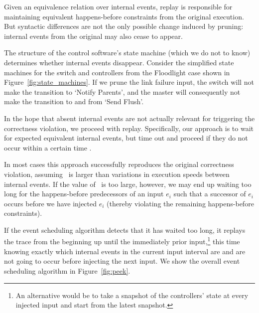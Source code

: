Given an equivalence relation over internal events, replay
is responsible for maintaining equivalent happens-before constraints from the
original execution.
But syntactic differences are not the
only possible change induced by pruning: internal events from the original
may also cease to appear.

The structure of the control
software's state machine (which we do not to know) determines whether
internal events disappear. Consider the simplified state machines for the switch and
controllers from the Floodlight case shown in
Figure~\ref{fig:state_machines}. If we prune the link failure input, the
switch will not make the transition to `Notify Parents', and the master will
consequently not make the transition to and from `Send Flush'.

In the hope that absent internal events are not actually relevant
for triggering the correctness violation, we proceed with replay.
Specifically, our approach is to wait for expected equivalent internal events, but time out and proceed
if they do not occur within a certain time \textepsilon.

In most cases this approach successfully reproduces the original correctness
violation, assuming \textepsilon~is larger than variations in execution speeds
between internal events. If the value of \textepsilon~is too large, however, we may end up
waiting too long for the happens-before predecessors of an input $e_i$ such that a
successor of $e_i$ occurs before we have injected $e_i$
(thereby violating the remaining happens-before constraints).

If the event scheduling algorithm detects that it has waited too long, it
replays the trace from the beginning up until the immediately prior input,\footnote{An alternative
would be to take a snapshot of the controllers' state at every injected input
and start from the latest snapshot.} this time
knowing exactly which internal events in the current input interval are
and are not going to occur before injecting the next input. We show the overall event scheduling algorithm
in Figure~\ref{fig:peek}.

